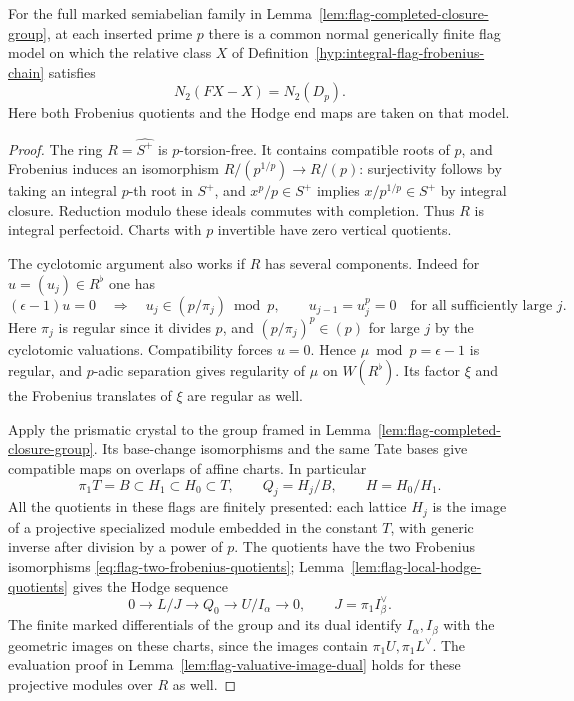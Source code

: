 \begin{auxlemma}\label{lem:flag-finite-frobenius-model}
For the full marked semiabelian family in Lemma~\ref{lem:flag-completed-closure-group}, at each inserted prime \(p\) there is a common normal generically finite flag model on which the relative class \(X\) of Definition~\ref{hyp:integral-flag-frobenius-chain} satisfies
\[
               N_2(FX-X)=N_2(D_p).
\]
Here both Frobenius quotients and the Hodge end maps are taken on that model.
\end{auxlemma}
\begin{proof}
The ring \(R=\widehat{S^+}\) is \(p\)-torsion-free. It contains compatible roots of \(p\), and Frobenius induces an isomorphism \(R/(p^{1/p})\to R/(p)\): surjectivity follows by taking an integral \(p\)-th root in \(S^+\), and \(x^p/p\in S^+\) implies \(x/p^{1/p}\in S^+\) by integral closure. Reduction modulo these ideals commutes with completion. Thus \(R\) is integral perfectoid. Charts with \(p\) invertible have zero vertical quotients.

The cyclotomic argument also works if \(R\) has several components. Indeed for \(u=(u_j)\in R^\flat\) one has
\[
   (\epsilon-1)u=0\quad\Longrightarrow\quad
   u_j\in(p/\pi_j)\bmod p,\qquad u_{j-1}=u_j^p=0
           \quad\text{for all sufficiently large }j.
\]
Here \(\pi_j\) is regular since it divides \(p\), and \((p/\pi_j)^p\in(p)\) for large \(j\) by the cyclotomic valuations. Compatibility forces \(u=0\). Hence \(\mu\bmod p=\epsilon-1\) is regular, and \(p\)-adic separation gives regularity of \(\mu\) on \(W(R^\flat)\). Its factor \(\xi\) and the Frobenius translates of \(\xi\) are regular as well.

Apply the prismatic crystal to the group framed in Lemma~\ref{lem:flag-completed-closure-group}. Its base-change isomorphisms and the same Tate bases give compatible maps on overlaps of affine charts. In particular
\[
 \pi_1 T=B\subset H_1\subset H_0\subset T,\qquad
 Q_j=H_j/B,\qquad H=H_0/H_1 .
\]
All the quotients in these flags are finitely presented: each lattice \(H_j\) is the image of a projective specialized module embedded in the constant \(T\), with generic inverse after division by a power of \(p\). The quotients have the two Frobenius isomorphisms \eqref{eq:flag-two-frobenius-quotients}; Lemma~\ref{lem:flag-local-hodge-quotients} gives the Hodge sequence
\[
  0\longrightarrow L/J\longrightarrow Q_0\longrightarrow U/I_\alpha\longrightarrow0,
          \qquad J=\pi_1 I_\beta^\vee .
\]
The finite marked differentials of the group and its dual identify \(I_\alpha,I_\beta\) with the geometric images on these charts, since the images contain \(\pi_1 U,\pi_1 L^\vee\). The evaluation proof in Lemma~\ref{lem:flag-valuative-image-dual} holds for these projective modules over \(R\) as well.


\end{proof}

